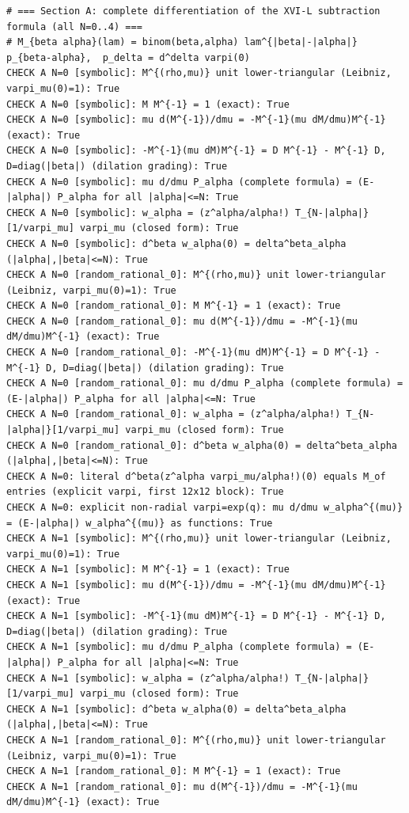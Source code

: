 \documentclass{article}
\theoremstyle{remark}
\begin{document}
\begin{lstlisting}
# === Section A: complete differentiation of the XVI-L subtraction formula (all N=0..4) ===
# M_{beta alpha}(lam) = binom(beta,alpha) lam^{|beta|-|alpha|} p_{beta-alpha},  p_delta = d^delta varpi(0)
CHECK A N=0 [symbolic]: M^{(rho,mu)} unit lower-triangular (Leibniz, varpi_mu(0)=1): True
CHECK A N=0 [symbolic]: M M^{-1} = 1 (exact): True
CHECK A N=0 [symbolic]: mu d(M^{-1})/dmu = -M^{-1}(mu dM/dmu)M^{-1} (exact): True
CHECK A N=0 [symbolic]: -M^{-1}(mu dM)M^{-1} = D M^{-1} - M^{-1} D, D=diag(|beta|) (dilation grading): True
CHECK A N=0 [symbolic]: mu d/dmu P_alpha (complete formula) = (E-|alpha|) P_alpha for all |alpha|<=N: True
CHECK A N=0 [symbolic]: w_alpha = (z^alpha/alpha!) T_{N-|alpha|}[1/varpi_mu] varpi_mu (closed form): True
CHECK A N=0 [symbolic]: d^beta w_alpha(0) = delta^beta_alpha (|alpha|,|beta|<=N): True
CHECK A N=0 [random_rational_0]: M^{(rho,mu)} unit lower-triangular (Leibniz, varpi_mu(0)=1): True
CHECK A N=0 [random_rational_0]: M M^{-1} = 1 (exact): True
CHECK A N=0 [random_rational_0]: mu d(M^{-1})/dmu = -M^{-1}(mu dM/dmu)M^{-1} (exact): True
CHECK A N=0 [random_rational_0]: -M^{-1}(mu dM)M^{-1} = D M^{-1} - M^{-1} D, D=diag(|beta|) (dilation grading): True
CHECK A N=0 [random_rational_0]: mu d/dmu P_alpha (complete formula) = (E-|alpha|) P_alpha for all |alpha|<=N: True
CHECK A N=0 [random_rational_0]: w_alpha = (z^alpha/alpha!) T_{N-|alpha|}[1/varpi_mu] varpi_mu (closed form): True
CHECK A N=0 [random_rational_0]: d^beta w_alpha(0) = delta^beta_alpha (|alpha|,|beta|<=N): True
CHECK A N=0: literal d^beta(z^alpha varpi_mu/alpha!)(0) equals M_of entries (explicit varpi, first 12x12 block): True
CHECK A N=0: explicit non-radial varpi=exp(q): mu d/dmu w_alpha^{(mu)} = (E-|alpha|) w_alpha^{(mu)} as functions: True
CHECK A N=1 [symbolic]: M^{(rho,mu)} unit lower-triangular (Leibniz, varpi_mu(0)=1): True
CHECK A N=1 [symbolic]: M M^{-1} = 1 (exact): True
CHECK A N=1 [symbolic]: mu d(M^{-1})/dmu = -M^{-1}(mu dM/dmu)M^{-1} (exact): True
CHECK A N=1 [symbolic]: -M^{-1}(mu dM)M^{-1} = D M^{-1} - M^{-1} D, D=diag(|beta|) (dilation grading): True
CHECK A N=1 [symbolic]: mu d/dmu P_alpha (complete formula) = (E-|alpha|) P_alpha for all |alpha|<=N: True
CHECK A N=1 [symbolic]: w_alpha = (z^alpha/alpha!) T_{N-|alpha|}[1/varpi_mu] varpi_mu (closed form): True
CHECK A N=1 [symbolic]: d^beta w_alpha(0) = delta^beta_alpha (|alpha|,|beta|<=N): True
CHECK A N=1 [random_rational_0]: M^{(rho,mu)} unit lower-triangular (Leibniz, varpi_mu(0)=1): True
CHECK A N=1 [random_rational_0]: M M^{-1} = 1 (exact): True
CHECK A N=1 [random_rational_0]: mu d(M^{-1})/dmu = -M^{-1}(mu dM/dmu)M^{-1} (exact): True

\end{lstlisting}
\end{document}
